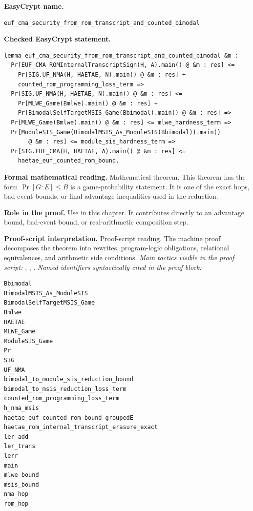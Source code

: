 \begin{formaltheorem}
\noindent\textbf{EasyCrypt name.}
\begin{lstlisting}[language=EasyCrypt,basicstyle=\ttfamily\scriptsize]
euf_cma_security_from_rom_transcript_and_counted_bimodal
\end{lstlisting}
\noindent\textbf{Checked EasyCrypt statement.}
\begin{lstlisting}[language=EasyCrypt,basicstyle=\ttfamily\scriptsize]
lemma euf_cma_security_from_rom_transcript_and_counted_bimodal &m :
  Pr[EUF_CMA_ROMInternalTranscriptSign(H, A).main() @ &m : res] <=
    Pr[SIG.UF_NMA(H, HAETAE, N).main() @ &m : res] +
    counted_rom_programming_loss_term =>
  Pr[SIG.UF_NMA(H, HAETAE, N).main() @ &m : res] <=
    Pr[MLWE_Game(Bmlwe).main() @ &m : res] +
    Pr[BimodalSelfTargetMSIS_Game(Bbimodal).main() @ &m : res] =>
  Pr[MLWE_Game(Bmlwe).main() @ &m : res] <= mlwe_hardness_term =>
  Pr[ModuleSIS_Game(BimodalMSIS_As_ModuleSIS(Bbimodal)).main()
       @ &m : res] <= module_sis_hardness_term =>
  Pr[SIG.EUF_CMA(H, HAETAE, A).main() @ &m : res] <=
    haetae_euf_counted_rom_bound.
\end{lstlisting}
\noindent\textbf{Formal mathematical reading.}
Mathematical theorem. This theorem has the form \(\Pr[G:E] \le B\) is a game-probability statement.  It is one of the exact hops, bad-event bounds, or final advantage inequalities used in the reduction.

\noindent\textbf{Role in the proof.}
Use in this chapter. It contributes directly to an advantage bound, bad-event bound, or real-arithmetic composition step.

\noindent\textbf{Proof-script interpretation.}
Proof-script reading. The machine proof decomposes the theorem into rewrites, program-logic obligations, relational equivalences, and arithmetic side conditions.
\emph{Main tactics visible in the proof script:} , , .
\emph{Named identifiers syntactically cited in the proof block:}
\begin{lstlisting}[language=EasyCrypt,basicstyle=\ttfamily\scriptsize]
Bbimodal
BimodalMSIS_As_ModuleSIS
BimodalSelfTargetMSIS_Game
Bmlwe
HAETAE
MLWE_Game
ModuleSIS_Game
Pr
SIG
UF_NMA
bimodal_to_module_sis_reduction_bound
bimodal_to_msis_reduction_loss_term
counted_rom_programming_loss_term
h_nma_msis
haetae_euf_counted_rom_bound_groupedE
haetae_rom_internal_transcript_erasure_exact
ler_add
ler_trans
lerr
main
mlwe_bound
msis_bound
nma_hop
rom_hop
\end{lstlisting}

\end{formaltheorem}

